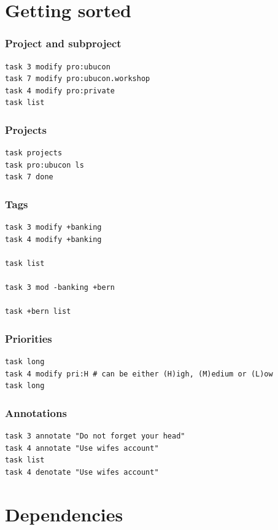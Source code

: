 \documentclass[t,handout]{beamer}
\begin{document}
\section{Getting sorted}

\begin{frame}[fragile]\frametitle{Project and subproject}
    \vfill
    \begin{lstlisting}
task 3 modify pro:ubucon
task 7 modify pro:ubucon.workshop
task 4 modify pro:private
task list
\end{lstlisting}
\end{frame}

\begin{frame}[fragile]\frametitle{Projects}
    \vfill
    \begin{lstlisting}
task projects
task pro:ubucon ls
task 7 done
\end{lstlisting}
\end{frame}

\begin{frame}[fragile]\frametitle{Tags}
    \vfill
    \begin{lstlisting}
task 3 modify +banking
task 4 modify +banking

task list

task 3 mod -banking +bern

task +bern list
\end{lstlisting}
\end{frame}

\begin{frame}[fragile]\frametitle{Priorities}
    \vfill
    \begin{lstlisting}
task long
task 4 modify pri:H # can be either (H)igh, (M)edium or (L)ow
task long
\end{lstlisting}
\end{frame}

\begin{frame}[fragile]\frametitle{Annotations}
    \vfill
    \begin{lstlisting}
task 3 annotate "Do not forget your head"
task 4 annotate "Use wifes account"
task list
task 4 denotate "Use wifes account"
\end{lstlisting}
\end{frame}

\section{Dependencies}
\end{document}
